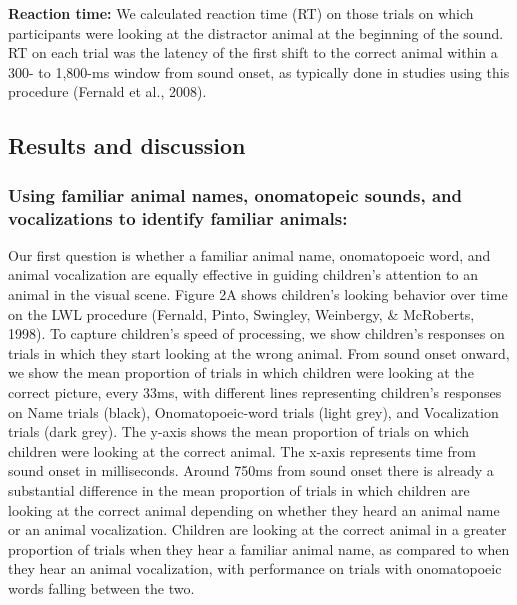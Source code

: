 \documentclass[english,floatsintext,man]{apa6}
\theoremstyle{definition}
\theoremstyle{definition}
\theoremstyle{definition}
\theoremstyle{remark}
\begin{document}
\textbf{Reaction time:} We calculated reaction time (RT) on those trials
on which participants were looking at the distractor animal at the
beginning of the sound. RT on each trial was the latency of the first
shift to the correct animal within a 300- to 1,800-ms window from sound
onset, as typically done in studies using this procedure (Fernald et
al., 2008).

\hypertarget{results-and-discussion}{%
\subsection{Results and discussion}\label{results-and-discussion}}

\hypertarget{using-familiar-animal-names-onomatopeic-sounds-and-vocalizations-to-identify-familiar-animals}{%
\subsubsection{Using familiar animal names, onomatopeic sounds, and
vocalizations to identify familiar
animals:}\label{using-familiar-animal-names-onomatopeic-sounds-and-vocalizations-to-identify-familiar-animals}}

Our first question is whether a familiar animal name, onomatopoeic word,
and animal vocalization are equally effective in guiding children's
attention to an animal in the visual scene. Figure 2A shows children's
looking behavior over time on the LWL procedure (Fernald, Pinto,
Swingley, Weinbergy, \& McRoberts, 1998). To capture children's speed of
processing, we show children's responses on trials in which they start
looking at the wrong animal. From sound onset onward, we show the mean
proportion of trials in which children were looking at the correct
picture, every 33ms, with different lines representing children's
responses on Name trials (black), Onomatopoeic-word trials (light grey),
and Vocalization trials (dark grey). The y-axis shows the mean
proportion of trials on which children were looking at the correct
animal. The x-axis represents time from sound onset in milliseconds.
Around 750ms from sound onset there is already a substantial difference
in the mean proportion of trials in which children are looking at the
correct animal depending on whether they heard an animal name or an
animal vocalization. Children are looking at the correct animal in a
greater proportion of trials when they hear a familiar animal name, as
compared to when they hear an animal vocalization, with performance on
trials with onomatopoeic words falling between the two.
\end{document}
